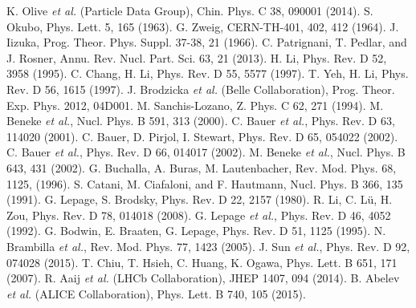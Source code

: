 \documentclass[preprint,superscriptaddress,nofootinbib]{revtex4}
\begin{document}
  \begin{thebibliography}{99}
          K. Olive {\em et al.} (Particle Data Group), Chin. Phys. C 38, 090001 (2014).
          S. Okubo, Phys. Lett. 5, 165 (1963).
          G. Zweig, CERN-TH-401, 402, 412 (1964).
          J. Iizuka, Prog. Theor. Phys. Suppl. 37-38, 21 (1966).
          C. Patrignani, T. Pedlar, and J. Rosner, Annu. Rev. Nucl. Part. Sci. 63, 21 (2013).
          H. Li, Phys. Rev. D 52, 3958 (1995).
          C. Chang,  H. Li, Phys. Rev. D 55, 5577 (1997).
          T. Yeh, H. Li, Phys. Rev. D 56, 1615 (1997).
          J. Brodzicka {\em et al.} (Belle Collaboration), Prog. Theor. Exp. Phys. 2012, 04D001.
          M. Sanchis-Lozano, Z. Phys. C 62, 271 (1994).
          M. Beneke {\em et al.}, Nucl. Phys. B 591, 313 (2000).
          C. Bauer {\em et al.},  Phys. Rev. D 63, 114020 (2001).
          C. Bauer, D. Pirjol, I. Stewart, Phys. Rev. D 65, 054022 (2002).
          C. Bauer {\em et al.}, Phys. Rev. D 66, 014017 (2002).
          M. Beneke {\em et al.}, Nucl. Phys. B 643, 431 (2002).
          G. Buchalla, A. Buras, M. Lautenbacher, Rev. Mod. Phys. 68, 1125, (1996).
          S. Catani, M. Ciafaloni, and F. Hautmann, Nucl. Phys. B 366, 135 (1991).
          G. Lepage, S. Brodsky, Phys. Rev. D 22, 2157 (1980).
          R. Li, C. L\"{u}, H. Zou, Phys. Rev. D 78, 014018 (2008).
          G. Lepage {\em et al.}, Phys. Rev. D 46, 4052 (1992).
          G. Bodwin, E. Braaten, G. Lepage, Phys. Rev. D 51, 1125 (1995).
          N. Brambilla {\em et al.}, Rev. Mod. Phys. 77, 1423 (2005).
          J. Sun {\em et al.}, Phys. Rev. D 92, 074028 (2015).
          T. Chiu, T. Hsieh, C. Huang, K. Ogawa, Phys. Lett. B 651, 171 (2007).
          R. Aaij {\em et al.} (LHCb Collaboration), JHEP 1407, 094 (2014).
          B. Abelev {\em et al.} (ALICE Collaboration), Phys. Lett. B 740, 105 (2015).
  \end{thebibliography}
  
\end{document}
